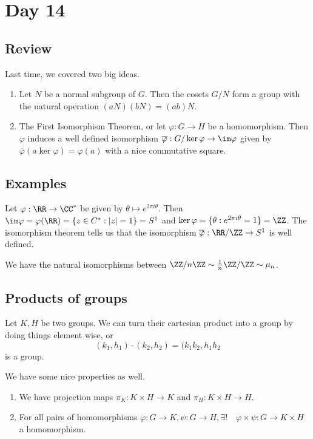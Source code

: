 \section{Day 14}

\subsection{Review}

Last time, we covered two big ideas.
\begin{enumerate}
\item Let $N$ be a normal subgroup of $G$. Then the cosets $G/N$ form a
group with the natural operation $(aN)(bN) = (ab)N$.
\item The First Isomorphism Theorem, or let $\varphi : G \to H$ be a
homomorphism. Then $\varphi$ induces a well defined isomorphism
$\overline{\varphi} : G / \ker \varphi \to \im \varphi$ given by
$\overline{\varphi}(a \ker \varphi) = \varphi(a)$ with a nice
commutative square.
\end{enumerate}

\subsection{Examples}
\begin{ex}
Let $\varphi : \RR \to \CC^*$ be given by $\theta \mapsto e^{2 \pi i
\theta}$. Then $\im \varphi = \varphi(\RR) = \lbrace z \in C^* : |z| = 1
\rbrace = S^1$ and $\ker \varphi = \lbrace \theta : e^{2 \pi i \theta} =
1 \rbrace = \ZZ$. The isomorphism theorem tells us that the isomorphism
$\overline{\varphi} : \RR / \ZZ \to S^1$ is well defined.
\end{ex}

\begin{ex}
We have the natural isomorphisms between $\ZZ / n\ZZ \sim \frac{1}{n}
\ZZ / \ZZ \sim \mu_n$.
\end{ex}

\subsection{Products of groups}
Let $K, H$ be two groups. We can turn their cartesian product into a
group by doing things element wise, or
\[ (k_1, h_1) \cdot (k_2, h_2) = (k_1 k_2, h_1 h_2 \]
is a group.

We have some nice properties as well.
\begin{enumerate}
\item We have projection maps $\pi_K : K \times H \to K$ and $\pi_H : K
\times H \to H$.
\item For all pairs of homomorphisms $\varphi : G \to K, \psi : G \to
H, \exists ! \quad \varphi \times \psi : G \to K \times H$ a
homomorphism.
\end{enumerate}

